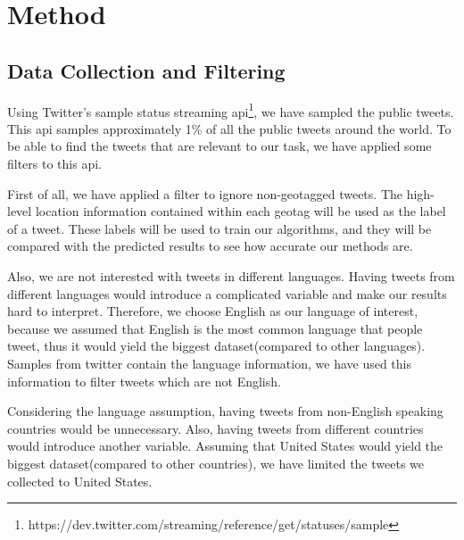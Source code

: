 \documentclass[twoside,11pt]{article}
\begin{document}


\section{Method}
\subsection{Data Collection and Filtering}

Using Twitter's sample status streaming api\footnote{https://dev.twitter.com/streaming/reference/get/statuses/sample}, we have sampled the public tweets. This api samples approximately 1\% of all the public tweets around the world. To be able to find the tweets that are relevant to our task, we have applied some filters to this api. 

First of all, we have applied a filter to ignore non-geotagged tweets. The high-level location information contained within each geotag will be used as the label of a tweet. These labels will be used to train our algorithms, and they will be compared with the predicted results to see how accurate our methods are.

Also, we are not interested with tweets in different languages. Having tweets from different languages would introduce a complicated variable and make our results hard to interpret. Therefore, we choose English as our language of interest, because we assumed that English is the most common language that people tweet, thus it would yield the biggest dataset(compared to other languages). Samples from twitter contain the language information, we have used this information to filter tweets which are not English. 

Considering the language assumption, having tweets from non-English speaking countries would be unnecessary. Also, having tweets from different countries would introduce another variable. Assuming that United States would yield the biggest dataset(compared to other countries), we have limited the tweets we collected to United States.
\end{document}
